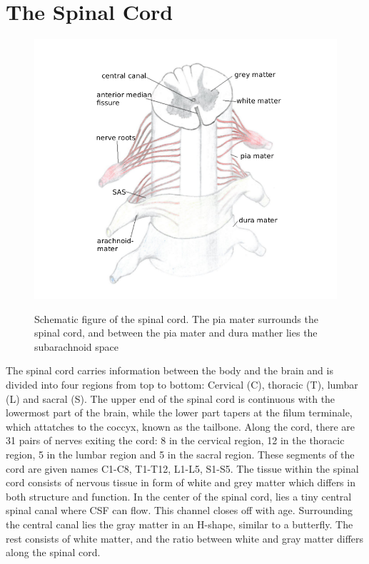\section{The Spinal Cord}
\begin{center}
\begin{figure}[!ht]
\includegraphics[scale=0.3]{figures/Spinal_Cord} \\
\caption{Schematic figure of the spinal cord. The pia mater surrounds the spinal cord, and between the pia mater and dura mather lies the subarachnoid space} \label{fig:Cord}
\end{figure}
\end{center}
The spinal cord carries information between the body and the brain and is divided into four regions from top to bottom: Cervical (C), thoracic (T), lumbar (L) and sacral (S). The upper end of the spinal cord is continuous with the lowermost part of the brain, while the lower part tapers at the filum terminale, which attatches to the coccyx, known as the tailbone. Along the cord, there are 31 pairs of nerves exiting the cord: 8 in the cervical region, 12 in the thoracic region, 5 in the lumbar region and 5 in the sacral region. These segments of the cord are given names C1-C8, T1-T12, L1-L5, S1-S5. The tissue within the spinal cord consists of nervous tissue in form of white and grey matter which differs in both structure and function. In the center of the spinal cord, lies a tiny central spinal canal where CSF can flow. This channel closes off with age. Surrounding the central canal lies the gray matter in an H-shape, similar to a butterfly. The rest consists of white matter, and the ratio between white and gray matter differs along the spinal cord. 
